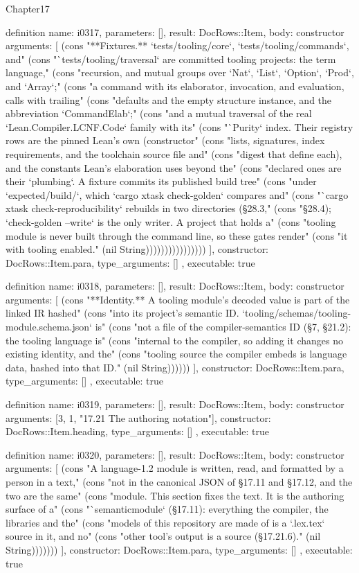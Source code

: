 \begin{lexlean}{Chapter17}
\begin{semanticmodule}
definition{
  name: i0317,
  parameters: [],
  result: DocRows::Item,
  body: constructor{
    arguments: [
      (cons "**Fixtures.** `tests/tooling/core`, `tests/tooling/commands`, and" (cons "`tests/tooling/traversal` are committed tooling projects: the term language," (cons "recursion, and mutual groups over `Nat`, `List`, `Option`, `Prod`, and `Array`;" (cons "a command with its elaborator, invocation, and evaluation, calls with trailing" (cons "defaults and the empty structure instance, and the abbreviation `CommandElab`;" (cons "and a mutual traversal of the real `Lean.Compiler.LCNF.Code` family with its" (cons "`Purity` index. Their registry rows are the pinned Lean's own (constructor" (cons "lists, signatures, index requirements, and the toolchain source file and" (cons "digest that define each), and the constants Lean's elaboration uses beyond the" (cons "declared ones are their `plumbing`. A fixture commits its published build tree" (cons "under `expected/build/`, which `cargo xtask check-golden` compares and" (cons "`cargo xtask check-reproducibility` rebuilds in two directories (§28.3," (cons "§28.4); `check-golden --write` is the only writer. A project that holds a" (cons "tooling module is never built through the command line, so these gates render" (cons "it with tooling enabled." (nil String))))))))))))))))
    ],
    constructor: DocRows::Item.para,
    type_arguments: []
  },
  executable: true
}

definition{
  name: i0318,
  parameters: [],
  result: DocRows::Item,
  body: constructor{
    arguments: [
      (cons "**Identity.** A tooling module's decoded value is part of the linked IR hashed" (cons "into its project's semantic ID. `tooling/schemas/tooling-module.schema.json` is" (cons "not a file of the compiler-semantics ID (§7, §21.2): the tooling language is" (cons "internal to the compiler, so adding it changes no existing identity, and the" (cons "tooling source the compiler embeds is language data, hashed into that ID." (nil String))))))
    ],
    constructor: DocRows::Item.para,
    type_arguments: []
  },
  executable: true
}

definition{
  name: i0319,
  parameters: [],
  result: DocRows::Item,
  body: constructor{
    arguments: [3, 1, "17.21 The authoring notation"],
    constructor: DocRows::Item.heading,
    type_arguments: []
  },
  executable: true
}

definition{
  name: i0320,
  parameters: [],
  result: DocRows::Item,
  body: constructor{
    arguments: [
      (cons "A language-1.2 module is written, read, and formatted by a person in a text," (cons "not in the canonical JSON of §17.11 and §17.12, and the two are the same" (cons "module. This section fixes the text. It is the authoring surface of a" (cons "`semanticmodule` (§17.11): everything the compiler, the libraries and the" (cons "models of this repository are made of is a `.lex.tex` source in it, and no" (cons "other tool's output is a source (§17.21.6)." (nil String)))))))
    ],
    constructor: DocRows::Item.para,
    type_arguments: []
  },
  executable: true
}


\end{semanticmodule}
\end{lexlean}
